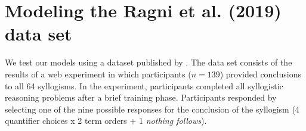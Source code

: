 \documentclass[floatsintext, doc]{apa6}
\begin{document}

%





\section{Modeling the Ragni et al. (2019) data set}

We test our models using a dataset published by . 
The data set consists of the results of a web experiment in which participants ($n = 139$) provided conclusions to all 64 syllogisms. In the experiment, participants completed all syllogistic reasoning problems after a brief training phase. Participants responded by selecting one of the nine possible responses for the conclusion of the syllogism (4 quantifier choices x 2 term orders + 1 \emph{nothing follows}).


%
\end{document}
